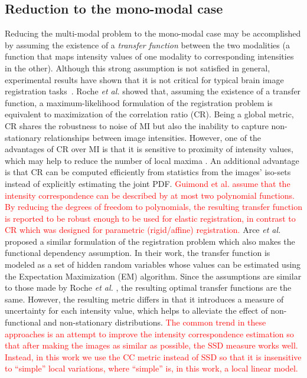 \vspace{-0.2cm}
\subsection{Reduction to the mono-modal case}
Reducing the multi-modal problem to the mono-modal case may be accomplished by assuming the existence of a {\it transfer function} between the two modalities (a function that maps intensity values of one modality to corresponding intensities in the other). Although this strong assumption is not satisfied in general, experimental results have shown that it is not critical for typical brain image registration tasks~\cite{Roche1998}. Roche {\it et al.} \cite{Roche2000} showed that, assuming the existence of a transfer function, a maximum-likelihood formulation of the registration problem is equivalent to maximization of the correlation ratio (CR). Being a global metric, CR shares the robustness to noise of MI but also the inability to capture non-stationary relationships between image intensities. However, one of the advantages of CR over MI is that it is sensitive to proximity of intensity values, which may help to reduce the number of local maxima \cite{Roche1998}. An additional advantage is that CR can be computed efficiently from statistics from the images' iso-sets instead of explicitly estimating the joint PDF. \textcolor{red}{ Guimond et al. \cite{Guimond2001} assume that the intensity correspondence can be described by at most two polynomial functions. By reducing the degrees of freedom to polynomials, the resulting transfer function is reported to be robust enough to be used for elastic registration, in contrast to CR which was designed for parametric (rigid/affine) registration.} Arce {\it et al.} \cite{Arce-santana2014} proposed a similar formulation of the registration problem which also makes the functional dependency assumption. In their work, the transfer function is modeled as a set of hidden random variables whose values can be estimated using the Expectation Maximization (EM) algorithm. Since the assumptions are similar to those made by Roche {\it et al.} \cite{Roche1998, Roche2000}, the resulting optimal transfer functions are the same. However, the resulting metric differs in that it introduces a measure of uncertainty for each intensity value, which helps to alleviate the effect of non-functional and non-stationary distributions. \textcolor{red}{ The common trend in these approaches is an attempt to improve the intensity correspondence estimation so that after making the images as similar as possible, the SSD measure works well. Instead, in this work we use the CC metric instead of SSD so that it is insensitive to “simple” local variations, where  “simple” is, in this work, a local linear model.}\\

